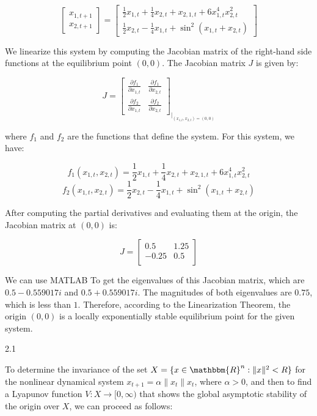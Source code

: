 \documentclass{article}
\begin{document}
\[
\begin{bmatrix}
x_{1,t+1} \\
x_{2,t+1}
\end{bmatrix}
=
\begin{bmatrix}
\frac{1}{2} x_{1,t} + \frac{1}{4} x_{2,t} + x_{2,1,t} + 6x^4_{1,t}x^2_{2,t} \\
\frac{1}{2} x_{2,t} - \frac{1}{4} x_{1,t} + \sin^2(x_{1,t} + x_{2,t})
\end{bmatrix}
\]

We linearize this system by computing the Jacobian matrix of the right-hand side functions at the equilibrium point \((0, 0)\). The Jacobian matrix \(J\) is given by:

\[
J = 
\begin{bmatrix}
\frac{\partial f_1}{\partial x_{1,t}} & \frac{\partial f_1}{\partial x_{2,t}} \\
\frac{\partial f_2}{\partial x_{1,t}} & \frac{\partial f_2}{\partial x_{2,t}}
\end{bmatrix}_{\bigg|_{(x_{1,t}, x_{2,t}) = (0, 0)}}
\]

where \(f_1\) and \(f_2\) are the functions that define the system. For this system, we have:

\[
f_1(x_{1,t}, x_{2,t}) = \frac{1}{2} x_{1,t} + \frac{1}{4} x_{2,t} + x_{2,1,t} + 6x^4_{1,t}x^2_{2,t}
\]
\[
f_2(x_{1,t}, x_{2,t}) = \frac{1}{2} x_{2,t} - \frac{1}{4} x_{1,t} + \sin^2(x_{1,t} + x_{2,t})
\]

After computing the partial derivatives and evaluating them at the origin, the Jacobian matrix at \((0, 0)\) is:

\[
J =
\begin{bmatrix}
0.5 & 1.25 \\
-0.25 & 0.5 \\
\end{bmatrix}
\]

We can use MATLAB To get the eigenvalues of this Jacobian matrix, which are \(0.5 - 0.559017i\) and \(0.5 + 0.559017i\). The magnitudes of both eigenvalues are \(0.75\), which is less than \(1\). Therefore, according to the Linearization Theorem, the origin \((0, 0)\) is a locally exponentially stable equilibrium point for the given system.

 2.1

To determine the invariance of the set \(X = \{x \in \mathbbm{R}^n : \|x\|^2 < R\}\) for the nonlinear dynamical system \(x_{t+1} = \alpha \|x_t\| x_t\), where \(\alpha > 0\), and then to find a Lyapunov function \(V : X \rightarrow [0, \infty)\) that shows the global asymptotic stability of the origin over \(X\), we can proceed as follows:
\end{document}
